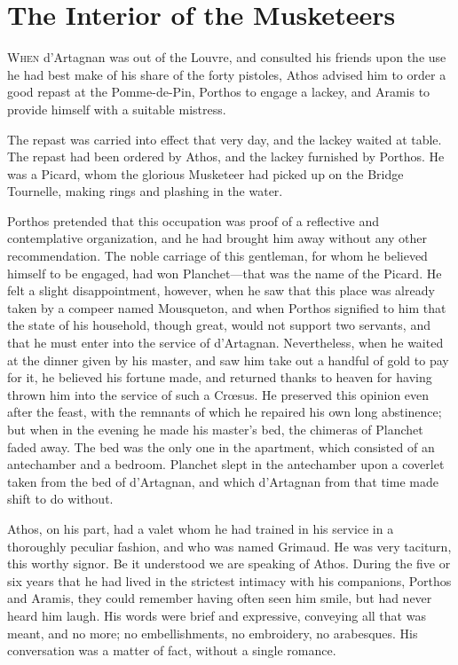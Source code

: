
\chapter{The Interior of the Musketeers}

\lettrine[]{W}{hen} d'Artagnan was out of the Louvre, and consulted his friends upon the use he had best make of his share of the forty pistoles, Athos advised him to order a good repast at the Pomme-de-Pin, Porthos to engage a lackey, and Aramis to provide himself with a suitable mistress. 

The repast was carried into effect that very day, and the lackey waited at table. The repast had been ordered by Athos, and the lackey furnished by Porthos. He was a Picard, whom the glorious Musketeer had picked up on the Bridge Tournelle, making rings and plashing in the water. 

Porthos pretended that this occupation was proof of a reflective and contemplative organization, and he had brought him away without any other recommendation. The noble carriage of this gentleman, for whom he believed himself to be engaged, had won Planchet---that was the name of the Picard. He felt a slight disappointment, however, when he saw that this place was already taken by a compeer named Mousqueton, and when Porthos signified to him that the state of his household, though great, would not support two servants, and that he must enter into the service of d'Artagnan. Nevertheless, when he waited at the dinner given by his master, and saw him take out a handful of gold to pay for it, he believed his fortune made, and returned thanks to heaven for having thrown him into the service of such a Crœsus. He preserved this opinion even after the feast, with the remnants of which he repaired his own long abstinence; but when in the evening he made his master's bed, the chimeras of Planchet faded away. The bed was the only one in the apartment, which consisted of an antechamber and a bedroom. Planchet slept in the antechamber upon a coverlet taken from the bed of d'Artagnan, and which d'Artagnan from that time made shift to do without. 

Athos, on his part, had a valet whom he had trained in his service in a thoroughly peculiar fashion, and who was named Grimaud. He was very taciturn, this worthy signor. Be it understood we are speaking of Athos. During the five or six years that he had lived in the strictest intimacy with his companions, Porthos and Aramis, they could remember having often seen him smile, but had never heard him laugh. His words were brief and expressive, conveying all that was meant, and no more; no embellishments, no embroidery, no arabesques. His conversation was a matter of fact, without a single romance. 

